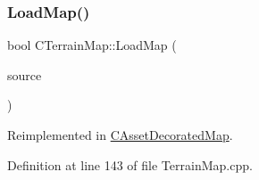 \subsubsection{\texorpdfstring{Load\+Map()}{LoadMap()}}
{\footnotesize\ttfamily bool C\+Terrain\+Map\+::\+Load\+Map (\begin{DoxyParamCaption}\item[{std\+::shared\+\_\+ptr$<$ \hyperlink{classCDataSource}{C\+Data\+Source} $>$}]{source }\end{DoxyParamCaption})\hspace{0.3cm}{\ttfamily [virtual]}}



Reimplemented in \hyperlink{classCAssetDecoratedMap_aaf40414c8e291bd45327787ddaf58f31}{C\+Asset\+Decorated\+Map}.



Definition at line 143 of file Terrain\+Map.\+cpp.


